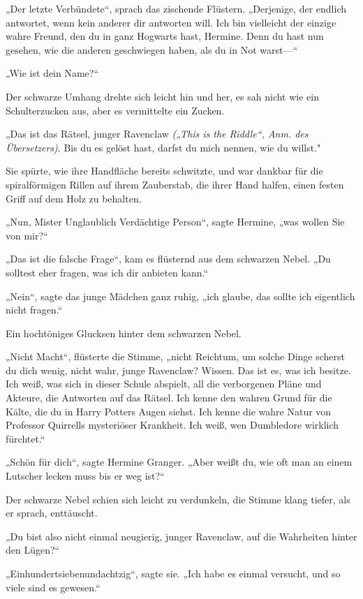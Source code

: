 {„Der letzte Verbündete“, sprach das zischende Flüstern. „Derjenige, der endlich antwortet, wenn kein anderer dir antworten will. Ich bin vielleicht der einzige wahre Freund, den du in ganz Hogwarts hast, Hermine. Denn du hast nun gesehen, wie die anderen geschwiegen haben, als du in Not warst—“

„Wie ist dein Name?“

Der schwarze Umhang drehte sich leicht hin und her, es sah nicht wie ein Schulterzucken aus, aber es vermittelte ein Zucken.

„Das ist das Rätsel, junger Ravenclaw \emph{(„This is the Riddle“, Anm. des Übersetzers)}. Bis du es gelöst hast, darfst du mich nennen, wie du willst."

Sie spürte, wie ihre Handfläche bereits schwitzte, und war dankbar für die spiralförmigen Rillen auf ihrem Zauberstab, die ihrer Hand halfen, einen festen Griff auf dem Holz zu behalten.

„Nun, Mister Unglaublich Verdächtige Person“, sagte Hermine, „was wollen Sie von mir?“

„Das ist die falsche Frage“, kam es flüsternd aus dem schwarzen Nebel. „Du solltest eher fragen, was ich dir anbieten kann.“

„Nein“, sagte das junge Mädchen ganz ruhig, „ich glaube, das sollte ich eigentlich nicht fragen.“

Ein hochtöniges Glucksen hinter dem schwarzen Nebel.

„Nicht Macht“, flüsterte die Stimme, „nicht Reichtum, um solche Dinge scherst du dich wenig, nicht wahr, junge Ravenclaw? Wissen. Das ist es, was ich besitze. Ich weiß, was sich in dieser Schule abspielt, all die verborgenen Pläne und Akteure, die Antworten auf das Rätsel. Ich kenne den wahren Grund für die Kälte, die du in Harry Potters Augen siehst. Ich kenne die wahre Natur von Professor Quirrells mysteriöser Krankheit. Ich weiß, wen Dumbledore wirklich fürchtet.“

„Schön für dich“, sagte Hermine Granger. „Aber weißt du, wie oft man an einem Lutscher lecken muss bis er weg ist?“

Der schwarze Nebel schien sich leicht zu verdunkeln, die Stimme klang tiefer, als er sprach, enttäuscht.

„Du bist also nicht einmal neugierig, junger Ravenclaw, auf die Wahrheiten hinter den Lügen?“

„Einhundertsiebenundachtzig“, sagte sie. „Ich habe es einmal versucht, und so viele sind es gewesen.“

}
